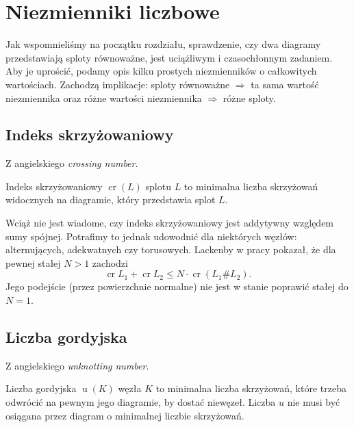 \section{Niezmienniki liczbowe}
Jak wspomnieliśmy na początku rozdziału, sprawdzenie,
czy dwa diagramy przedstawiają sploty równoważne,
jest uciążliwym i czasochłonnym zadaniem.
Aby je uprościć, podamy opis kilku prostych niezmienników o całkowitych wartościach.
Zachodzą implikacje:
sploty równoważne $\Rightarrow$ ta sama wartość niezmiennika
oraz różne wartości niezmiennika $\Rightarrow$ różne sploty.

\subsection{Indeks skrzyżowaniowy} %
\label{sub:crossing_number}
Z angielskiego \emph{crossing number}.

\begin{definition}
    Indeks skrzyżowaniowy $\operatorname{cr}(L)$ splotu $L$ to
    minimalna liczba skrzyżowań widocznych na diagramie,
    który przedstawia splot $L$.
\end{definition}

Wciąż nie jest wiadome, czy indeks skrzyżowaniowy jest addytywny względem sumy spójnej.
Potrafimy to jednak udowodnić dla niektórych węzłów: alternujących, adekwatnych czy torusowych.
Lackenby w pracy \cite{lackenby09} pokazał, że dla pewnej stałej $N > 1$ zachodzi
\[
    \operatorname{cr} L_1 + \operatorname{cr} L_2 \le N \cdot \operatorname{cr} (L_1 \# L_2).
\]
Jego podejście (przez powierzchnie normalne) nie jest w stanie poprawić stałej do $N = 1$.


\subsection{Liczba gordyjska} %
\label{sub:unknotting_number}
Z angielskiego \emph{unknotting number}.

\begin{definition}
    Liczba gordyjska $\operatorname{u}(K)$ węzła $K$ to minimalna liczba skrzyżowań,
    które trzeba odwrócić na pewnym jego diagramie, by dostać niewęzeł.
    Liczba $u$ nie musi być osiągana przez diagram o minimalnej liczbie skrzyżowań.
\end{definition}

